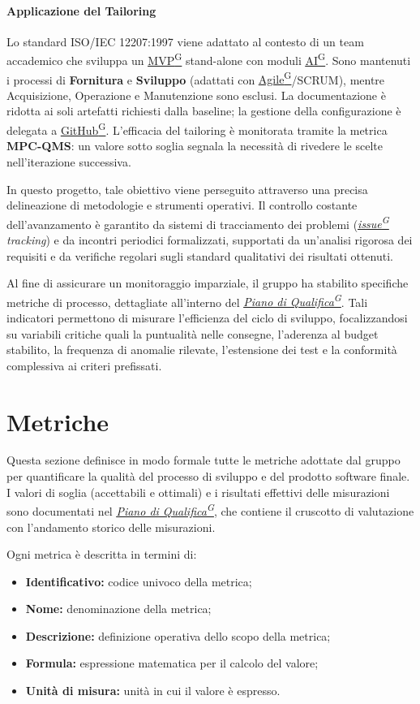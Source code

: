 \documentclass[a4paper,12pt]{article}
\providecommand{\glslink}[2]{\href{https://alittlebyte-19.github.io/Documentazione/glossario.html\#gls-#1}{\underline{#2}\textsuperscript{\scriptsize G}}}
\begin{document}
\paragraph{Applicazione del Tailoring}
Lo standard ISO/IEC 12207:1997 viene adattato al contesto di un team accademico che sviluppa un \glslink{mvp-minimum-viable-product}{MVP} stand-alone con moduli \glslink{intelligenza-artificiale-ai}{AI}. Sono mantenuti i processi di \textbf{Fornitura} e \textbf{Sviluppo} (adattati con \glslink{agile}{Agile}/SCRUM), mentre Acquisizione, Operazione e Manutenzione sono esclusi. La documentazione è ridotta ai soli artefatti richiesti dalla baseline; la gestione della configurazione è delegata a \glslink{github}{GitHub}. L'efficacia del tailoring è monitorata tramite la metrica \textbf{MPC-QMS}: un valore sotto soglia segnala la necessità di rivedere le scelte nell'iterazione successiva.

In questo progetto, tale obiettivo viene perseguito attraverso una precisa delineazione di metodologie e strumenti operativi. Il controllo costante dell'avanzamento è garantito da sistemi di tracciamento dei problemi (\textit{\glslink{issue}{issue} tracking}) e da incontri periodici formalizzati, supportati da un'analisi rigorosa dei requisiti e da verifiche regolari sugli standard qualitativi dei risultati ottenuti.

Al fine di assicurare un monitoraggio imparziale, il gruppo ha stabilito specifiche metriche di processo, dettagliate all'interno del \textit{\glslink{piano-di-qualifica}{Piano di Qualifica}}. Tali indicatori permettono di misurare l'efficienza del ciclo di sviluppo, focalizzandosi su variabili critiche quali la puntualità nelle consegne, l'aderenza al budget stabilito, la frequenza di anomalie rilevate, l'estensione dei test e la conformità complessiva ai criteri prefissati.

\section{Metriche}
Questa sezione definisce in modo formale tutte le metriche adottate dal gruppo per quantificare la qualità del processo di sviluppo e del prodotto software finale. I valori di soglia (accettabili e ottimali) e i risultati effettivi delle misurazioni sono documentati nel \textit{\glslink{piano-di-qualifica}{Piano di Qualifica}}, che contiene il cruscotto di valutazione con l'andamento storico delle misurazioni.

Ogni metrica è descritta in termini di:
\begin{itemize}
    \item \textbf{Identificativo:} codice univoco della metrica;
    \item \textbf{Nome:} denominazione della metrica;
    \item \textbf{Descrizione:} definizione operativa dello scopo della metrica;
    \item \textbf{Formula:} espressione matematica per il calcolo del valore;
    \item \textbf{Unità di misura:} unità in cui il valore è espresso.
\end{itemize}
\end{document}
